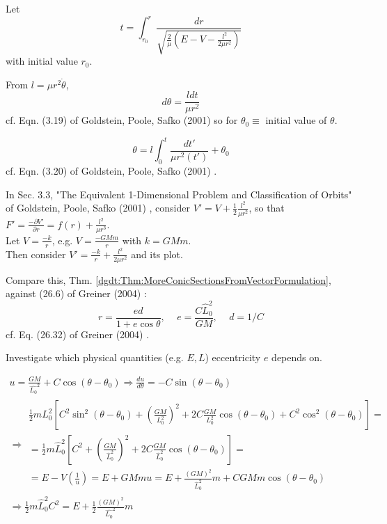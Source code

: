 Let
\[
t =\int_{r_0}^r \frac{dr}{ \sqrt{ \frac{2}{\mu} \left( E - V - \frac{l^2}{2 \mu r^2 } \right) } }
\]
with initial value $r_0$.

From $l= \mu r^2 \dot{\theta}$,
\begin{equation}
d\theta = \frac{l dt}{\mu r^2} 
\end{equation}
cf. Eqn. (3.19) of Goldstein, Poole, Safko (2001) \cite{dgdt:GPS2001} so for $\theta_0 \equiv $ initial value of $\theta$.

\begin{equation}
\theta = l \int_0^t \frac{dt'}{ \mu r^2(t') } + \theta_0
\end{equation}
cf. Eqn. (3.20) of Goldstein, Poole, Safko (2001) \cite{dgdt:GPS2001}.

In Sec. 3.3, "The Equivalent 1-Dimensional Problem and Classification of Orbits" of  Goldstein, Poole, Safko (2001) \cite{dgdt:GPS2001}, consider $V ' = V + \frac{1}{2} \frac{l^2}{\mu r^2}$, so that $F' = \frac{-\partial V'}{\partial r} = f(r) + \frac{l^2}{\mu r^3}$. \\

Let $V = \frac{-k}{r}$, e.g. $V = \frac{-GMm}{r} $ with $k = GMm$. \\

Then consider $V' = \frac{-k}{r} + \frac{l^2}{2\mu r^2}$ and its plot.


Compare this, Thm. \ref{dgdt:Thm:MoreConicSectionsFromVectorFormulation}, against (26.6) of Greiner (2004) \cite{dgdt:Grei2004}:
\begin{equation}\label{dgdt:Eq:ConicSectionPolarCoordinatesFocusCenter}
r = \frac{ed}{ 1 + e\cos{\theta}}, \quad \, e = \frac{C\widehat{L}_0^2}{GM}, \quad \, d = 1/C
\end{equation} cf. Eq. (26.32) of Greiner (2004) \cite{dgdt:Grei2004}. 

Investigate which physical quantities (e.g. $E, L$) eccentricity $e$ depends on.

\[
\begin{gathered}
u = \frac{GM}{ \widehat{L_0}^2 } + C \cos{(\theta - \theta_0)} \Longrightarrow \frac{du}{d\theta} = -C \sin{(\theta - \theta_0)} \\
\Longrightarrow \begin{gathered}
\frac{1}{2} m L_0^2 \left[ C^2 \sin^2{ (\theta - \theta_0)} + \left( \frac{GM}{L_0^2} \right)^2 + 2 C \frac{GM}{L_0^2} \cos{(\theta - \theta_0)} + C^2 \cos^2{(\theta - \theta_0)} \right] = \\
= \frac{1}{2} m \widehat{L}_0^2 \left[ C^2 + \left( \frac{GM}{\widehat{L}_0^2 } \right)^2 + 2 C \frac{GM}{ \widehat{L}_0^2 } \cos{(\theta - \theta_0)} \right] = \\
= E - V\left( \frac{1}{u} \right) = E + GMmu = E + \frac{(GM)^2 }{ \widehat{L}_0^2 } m + C GM m \cos{(\theta - \theta_0)}
\end{gathered} \\
\Longrightarrow \frac{1}{2} m \widehat{L}_0^2 C^2 = E + \frac{1}{2} \frac{ (GM)^2 }{ \widehat{L_0}^2 } m 
\end{gathered} 
\]

